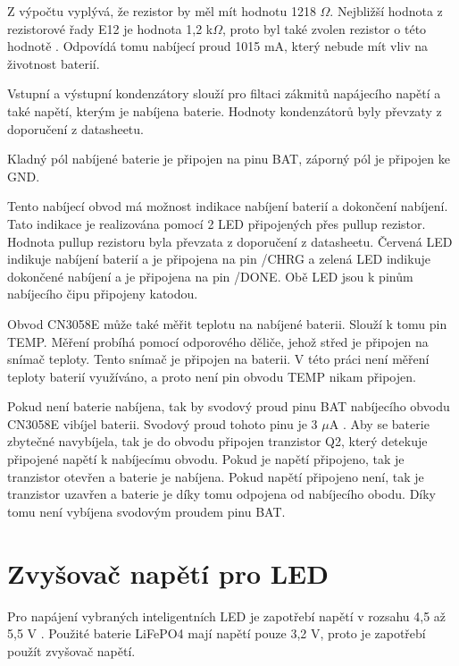
Z výpočtu vyplývá, že rezistor by měl mít hodnotu 1218 $\Omega$. Nejbližší hodnota z rezistorové řady E12 je hodnota 1,2 k$\Omega$, proto byl také zvolen rezistor 
o této hodnotě \cite{rezistorova_rada}. Odpovídá tomu nabíjecí proud 1015 mA, který nebude mít vliv na životnost baterií. 


Vstupní a výstupní kondenzátory slouží pro filtaci zákmitů napájecího napětí a také napětí, kterým je nabíjena baterie. Hodnoty kondenzátorů byly převzaty
z doporučení z datasheetu.

Kladný pól nabíjené baterie je připojen na pinu BAT, záporný pól je připojen ke GND. 

Tento nabíjecí obvod má možnost indikace nabíjení baterií a dokončení nabíjení. Tato indikace je realizována pomocí 2 LED připojených přes pullup rezistor. Hodnota
pullup rezistoru byla převzata z doporučení z datasheetu. Červená LED indikuje nabíjení baterií a je připojena na pin /CHRG a zelená LED indikuje dokončené nabíjení 
a je připojena na pin /DONE. Obě LED jsou k pinům nabíjecího čipu připojeny katodou. 

Obvod CN3058E může také měřit teplotu na nabíjené baterii. Slouží k tomu pin TEMP. Měření probíhá pomocí odporového děliče, jehož střed je připojen na snímač teploty. 
Tento snímač je připojen na baterii. V této práci není měření teploty baterií využíváno, a proto není pin obvodu TEMP nikam připojen. 


Pokud není baterie nabíjena, tak by svodový proud pinu BAT nabíjecího obvodu CN3058E vibíjel baterii. Svodový proud tohoto pinu je 3 $\mu$A \cite{charger_dtsh}. 
Aby se baterie zbytečné navybíjela, tak je do obvodu připojen tranzistor Q2, který detekuje připojené napětí k nabíjecímu obvodu. Pokud je napětí připojeno, tak je 
tranzistor otevřen a baterie je nabíjena. Pokud napětí připojeno není, tak je tranzistor uzavřen a baterie je díky tomu odpojena od nabíjecího obodu. Díky tomu 
není vybíjena svodovým proudem pinu BAT. 

\section{Zvyšovač napětí pro LED}
Pro napájení vybraných inteligentních LED je zapotřebí napětí v rozsahu 4,5 až 5,5 V \cite{WS2812C_dtsh}. Použité baterie LiFePO4 mají napětí pouze 3,2 V, proto je 
zapotřebí použít zvyšovač napětí. 

